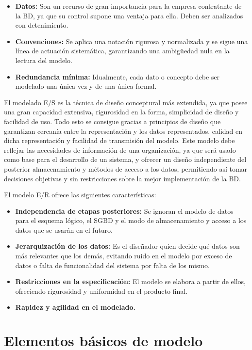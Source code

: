 \begin{itemize}
	\item\textbf{Datos:} Son un recurso de gran importancia para la empresa contratante de la BD, ya que su control supone una ventaja para ella. Deben ser analizados con detenimiento.
	\item\textbf{Convenciones:} Se aplica una notación rigurosa y normalizada y se sigue una línea de actuación sistemática, garantizando una ambigüedad nula en la lectura del modelo.
	\item\textbf{Redundancia mínima:} Idualmente, cada dato o concepto debe ser modelado una única vez y de una única formal.
\end{itemize}

El modelado E/S es la técnica de diseño conceptural más extendida, ya que posee una gran capacidad extensiva, rigurosidad en la forma, simplicidad de diseño y facilidad de uso.
Todo esto se consigue gracias a principios de diseño que garantizan cercanía entre la representación y los datos representados, calidad en dicha representación y facilidad de transmisión del modelo.
Este modelo debe reflejar las necesidades de información de una organización, ya que será usado como base para el desarrollo de un sistema, y ofrecer un diseño independiente del posterior almacenamiento y métodos de acceso a los datos, permitiendo así tomar decisiones objetivas y sin restricciones sobre la mejor implementación de la BD\@.

El modelo E/R ofrece las siguientes características:

\begin{itemize}
	\item\textbf{Independencia de etapas posteriores:} Se ignoran el modelo de datos para el esquema lógico, el SGBD y el modo de almacenamiento y acceso a los datos que se usarán en el futuro.
	\item\textbf{Jerarquización de los datos:} Es el diseñador quien decide qué datos son más relevantes que los demás, evitando ruido en el modelo por exceso de datos o falta de funcionalidad del sistema por falta de los mismo.
	\item\textbf{Restricciones en la especificación:} El modelo se elabora a partir de ellos, ofreciendo rigurosidad y uniformidad en el producto final.
	\item\textbf{Rapidez y agilidad en el modelado.}
\end{itemize}

\section{Elementos básicos de modelo}


